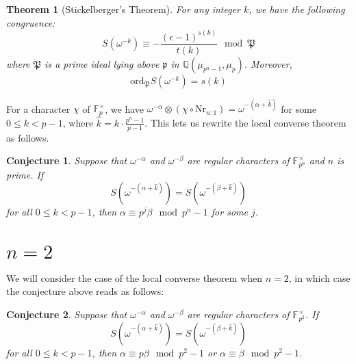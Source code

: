 \documentclass[12pt]{article}
\theoremstyle{customtheorem}%
\newtheorem{theorem}{Theorem}[section]
\newtheorem{conj}{Conjecture}
\theoremstyle{remark}
\theoremstyle{definition}
\numberwithin{equation}{section}
\numberwithin{theorem}{section}
\newcommand{\F}{\mathbb{F}}
\newcommand{\Q}{\mathbb{Q}}
\newcommand{\ord}{\textrm{ord}}
\begin{document}
\begin{theorem}[Stickelberger's Theorem] 
For any integer $k$, we have the following congruence: \[ S(\omega^{-k}) \equiv -\frac{(\epsilon - 1)^{s(k)}}{t(k)} \mod \mathfrak{P}\] where $\mathfrak{P}$ is a prime ideal lying above $\mathfrak{p}$ in $\Q(\mu_{p^n-1}, \mu_p)$. 
Moreover, \[ \ord_{\mathfrak{P}}S(\omega^{-k}) = s(k)\]
\end{theorem}

For a character $\chi$ of $\F_p^\times$, we have $\omega^{-\alpha} \otimes (\chi \circ \text{Nr}_{n:1}) = \omega^{-(\alpha + \hat{k})}$ for some $0 \leq k < p-1$, where $\hat{k} = k \cdot \frac{p^n - 1}{p-1}$. 
This lets us rewrite the local converse theorem as follows.
\begin{conj}
Suppose that $\omega^{-\alpha}$ and $\omega^{-\beta}$ are regular characters of $\F_{p^n}^\times$ and $n$ is prime. 
If \[S(\omega^{-(\alpha + \hat{k})}) = S(\omega^{-(\beta + \hat{k})})\] for all $0 \leq k < p-1$, then $\alpha \equiv p^j \beta \mod p^n - 1$ for some $j$.
\end{conj}

\section{$n=2$} 

We will consider the case of the local converse theorem when $n=2$, in which case the conjecture above reads as follows:

\begin{conj}
Suppose that $\omega^{-\alpha}$ and $\omega^{-\beta}$ are regular characters of $\F_{p^2}^\times$. 
If \[S(\omega^{-(\alpha + \hat{k})}) = S(\omega^{-(\beta + \hat{k})})\] for all $0 \leq k < p-1$, then $\alpha \equiv p \beta \mod p^2 - 1$ or $\alpha \equiv \beta \mod p^2 - 1$.
\end{conj}
\end{document}
